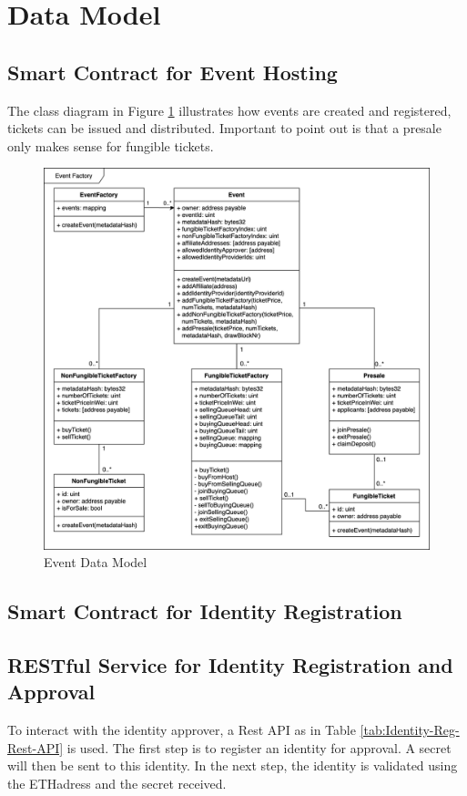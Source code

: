 \section{Data Model}


\subsection{Smart Contract for Event Hosting}
The class diagram in Figure \ref{fig:event-data-model} illustrates how events are created and registered, tickets can be issued and distributed. Important to point out is that a presale only makes sense for fungible tickets. 
\begin{figure}[H]
    \centering
    \includegraphics[width=16cm]{design/diagrams/event-factory-class-diagramm.png}
    \caption{Event Data Model}
    \label{fig:event-data-model}
\end{figure}

\subsection{Smart Contract for Identity Registration}

\subsection{RESTful Service for Identity Registration and Approval}
To interact with the identity approver, a Rest API as in Table \ref{tab:Identity-Reg-Rest-API} is used. The first step is to register an identity for approval. A secret will then be sent to this identity. In the next step, the identity is validated using the ETHadress and the secret received.

